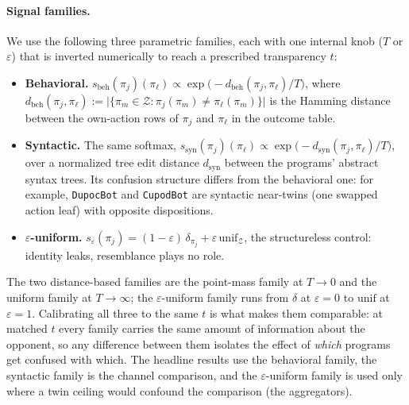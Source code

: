 \paragraph{Signal families.} We use the following three parametric families, each with one internal knob ($T$ or $\varepsilon$) that is inverted numerically to reach a prescribed transparency $t$:
\begin{itemize}
    \item \textbf{Behavioral.} $s_{\mathrm{beh}}(\pi_j)(\pi_\ell) \propto \exp\bigl(-d_{\mathrm{beh}}(\pi_j,\pi_\ell)/T\bigr)$, where $d_{\mathrm{beh}}(\pi_j,\pi_\ell) := \bigl|\{\pi_m \in \mathcal{Z} : \pi_j(\pi_m) \neq \pi_\ell(\pi_m)\}\bigr|$ is the Hamming distance between the own-action rows of $\pi_j$ and $\pi_\ell$ in the outcome table.
    \item \textbf{Syntactic.} The same softmax, $s_{\mathrm{syn}}(\pi_j)(\pi_\ell) \propto \exp\bigl(-d_{\mathrm{syn}}(\pi_j,\pi_\ell)/T\bigr)$, over a normalized tree edit distance $d_{\mathrm{syn}}$ \citep{tree_signal_family} between the programs' abstract syntax trees. Its confusion structure differs from the behavioral one: for example, \texttt{DupocBot} and \texttt{CupodBot} are syntactic near-twins (one swapped action leaf) with opposite dispositions.
    \item \textbf{$\varepsilon$-uniform.} $s_{\varepsilon}(\pi_j) = (1-\varepsilon)\,\delta_{\pi_j} + \varepsilon\,\mathrm{unif}_{\mathcal{Z}}$, the structureless control: identity leaks, resemblance plays no role.
\end{itemize}
The two distance-based families are the point-mass family at $T \to 0$ and the uniform family at $T \to \infty$; the $\varepsilon$-uniform family runs from $\delta$ at $\varepsilon = 0$ to $\mathrm{unif}$ at $\varepsilon = 1$. Calibrating all three to the same $t$ is what makes them comparable: at matched $t$ every family carries the same amount of information about the opponent, so any difference between them isolates the effect of \emph{which} programs get confused with which. The headline results use the behavioral family, the syntactic family is the channel comparison, and the $\varepsilon$-uniform family is used only where a twin ceiling would confound the comparison (the aggregators).

